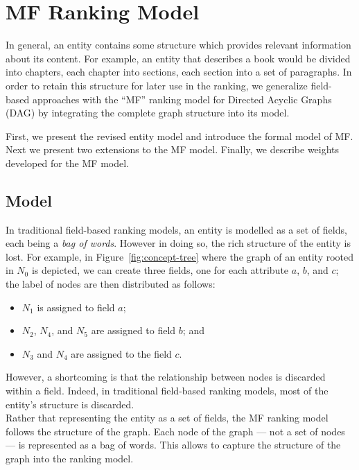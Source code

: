 \section{MF Ranking Model}
\label{chap:tree-ranking:mf-model}

In general, an entity contains some structure which provides relevant information about its content. For example, an entity that describes a book would be divided into chapters, each chapter into sections, each section into a set of paragraphs. In order to retain this structure for later use in the ranking, we generalize field-based approaches with the ``MF'' ranking model for Directed Acyclic Graphs (DAG) by integrating the complete graph structure into its model.

First, we present the revised entity model and introduce the formal model of \gls{MF}. Next we present two extensions to the \gls{MF} model. Finally, we describe weights developed for the \gls{MF} model.

\subsection{Model}

In traditional field-based ranking models, an entity is modelled as a set of fields, each being a \emph{bag of words}. However in doing so, the rich structure of the entity is lost. For example, in Figure~\ref{fig:concept-tree} where the graph of an entity rooted in $N_0$ is depicted, we can create three fields, one for each attribute $a$, $b$, and $c$; the label of nodes are then distributed as follows:
\begin{itemize}
	\item $N_1$ is assigned to field $a$;
	\item $N_2$, $N_4$, and $N_5$ are assigned to field $b$; and
	\item $N_3$ and $N_4$ are assigned to the field $c$.
\end{itemize}
However, a shortcoming is that the relationship between nodes is discarded within a field. Indeed, in traditional field-based ranking models, most of the entity's structure is discarded.\\

Rather that representing the entity as a set of fields, the \gls{MF} ranking model follows the structure of the graph. Each node of the graph --- not a set of nodes --- is represented as a bag of words. This allows to capture the structure of the graph into the ranking model.

